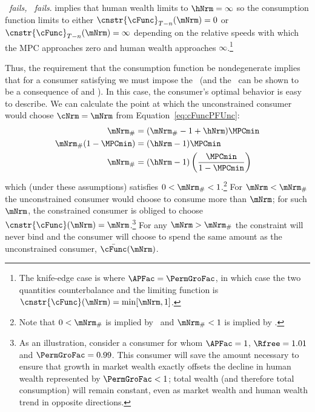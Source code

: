 \documentclass[\econtexRoot/BufferStockTheory]{subfiles}
\begin{document}
\hypertarget{cnclGICRawcnclRICcnclFHWC}{}

\textit{{\RIC}~fails, {\FHWC}~fails}.
{\cncl{\FHWC}} implies that human wealth limits to $\hNrm =
\infty$ so the consumption function limits to either
$\cnstr{\cFunc}_{T-n}(\mNrm) = 0$ or
$\cnstr{\cFunc}_{T-n}(\mNrm) = \infty$ depending on the relative
speeds with which the MPC approaches zero and human wealth approaches
$\infty$.\footnote{The knife-edge case is where $\APFac = \PermGroFac$, in
  which case the two quantities counterbalance and the limiting
  function is $\cnstr{\cFunc}(\mNrm)=\min[\mNrm,1]$.}

\let\TableWidth\relax
{\newlength\TableWidth}

Thus, the requirement that the consumption function be nondegenerate
implies that for a consumer satisfying \cncl{\GICRaw} we must impose
the \RIC~(and the \FHWC~can be shown to be a consequence of \cncl{\GICRaw} and \RIC).
In
this case, the consumer's optimal behavior is easy to describe.
We
can calculate the point at which the unconstrained consumer would
choose $\cNrm = \mNrm$ from Equation~\eqref{eq:cFuncPFUnc}:
\begin{equation}\begin{gathered}\begin{aligned}
  \mNrm_{\#}  & = (\mNrm_{\#}-1+\hNrm)\MPCmin
  \\ \mNrm_{\#}(1-\MPCmin)  & = (\hNrm - 1)\MPCmin
  \\ \mNrm_{\#}  & = (\hNrm - 1)\left(\frac{\MPCmin}{1-\MPCmin}\right)
\end{aligned}\end{gathered}\end{equation}
which (under these assumptions) satisfies $0 < \mNrm_{\#} < 1$.\footnote{Note that $0 < \mNrm_{\#}$ is implied by \RIC~and $ \mNrm_{\#}<1$ is implied by \cncl{\GICRaw}.}  For
$\mNrm < \mNrm_{\#}$ the unconstrained consumer would choose to
consume more than $\mNrm$; for such $\mNrm$, the constrained consumer
is obliged to choose $\cnstr{\cFunc}(\mNrm) = \mNrm$.\footnote{As an
  illustration, consider a consumer for whom $\APFac = 1$, $\Rfree
  =1.01$ and $\PermGroFac = 0.99$.
This consumer will save the amount
  necessary to ensure that growth in market wealth exactly offsets the
  decline in human wealth represented by $\PermGroFac < 1$; total wealth
  (and therefore total consumption) will remain constant, even as
  market wealth and human wealth trend in opposite directions.}  For
any $\mNrm > \mNrm_{\#}$ the constraint will never bind and the
consumer will choose to spend the same amount as the unconstrained
consumer, $\bar{\cFunc}(\mNrm)$.
\end{document}
